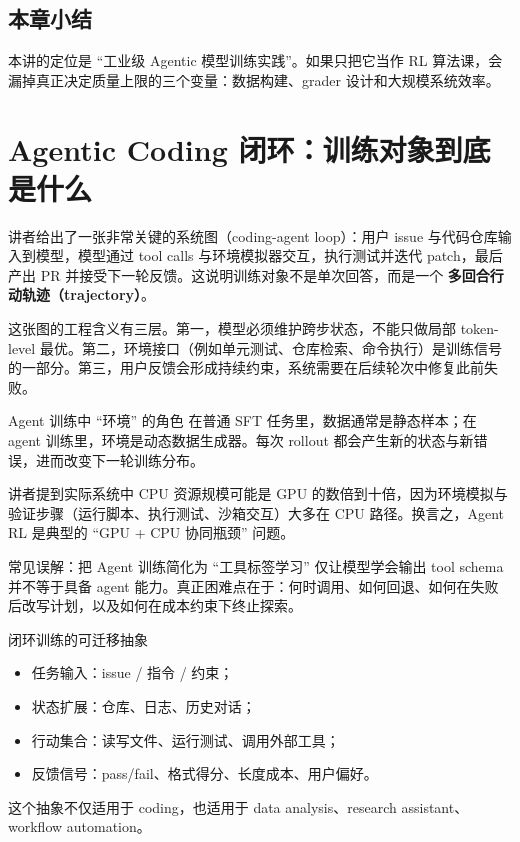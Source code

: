 \documentclass[a4paper]{article}
\begin{document}
\subsection{本章小结}
本讲的定位是 ``工业级 Agentic 模型训练实践''。如果只把它当作 RL 算法课，会漏掉真正决定质量上限的三个变量：数据构建、grader 设计和大规模系统效率。

\section{Agentic Coding 闭环：训练对象到底是什么}

讲者给出了一张非常关键的系统图（coding-agent loop）：用户 issue 与代码仓库输入到模型，模型通过 tool calls 与环境模拟器交互，执行测试并迭代 patch，最后产出 PR 并接受下一轮反馈。这说明训练对象不是单次回答，而是一个 \textbf{多回合行动轨迹（trajectory）}。

这张图的工程含义有三层。第一，模型必须维护跨步状态，不能只做局部 token-level 最优。第二，环境接口（例如单元测试、仓库检索、命令执行）是训练信号的一部分。第三，用户反馈会形成持续约束，系统需要在后续轮次中修复此前失败。

\begin{knowledgebox}{Agent 训练中 ``环境'' 的角色}
在普通 SFT 任务里，数据通常是静态样本；在 agent 训练里，环境是动态数据生成器。每次 rollout 都会产生新的状态与新错误，进而改变下一轮训练分布。
\end{knowledgebox}

讲者提到实际系统中 CPU 资源规模可能是 GPU 的数倍到十倍，因为环境模拟与验证步骤（运行脚本、执行测试、沙箱交互）大多在 CPU 路径。换言之，Agent RL 是典型的 ``GPU + CPU 协同瓶颈'' 问题。

\begin{warningbox}{常见误解：把 Agent 训练简化为 ``工具标签学习''}
仅让模型学会输出 tool schema 并不等于具备 agent 能力。真正困难点在于：何时调用、如何回退、如何在失败后改写计划，以及如何在成本约束下终止探索。
\end{warningbox}

\begin{importantbox}{闭环训练的可迁移抽象}
\begin{itemize}
    \item 任务输入：issue / 指令 / 约束；
    \item 状态扩展：仓库、日志、历史对话；
    \item 行动集合：读写文件、运行测试、调用外部工具；
    \item 反馈信号：pass/fail、格式得分、长度成本、用户偏好。
\end{itemize}
这个抽象不仅适用于 coding，也适用于 data analysis、research assistant、workflow automation。
\end{importantbox}
\end{document}
